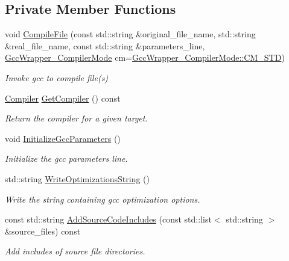\subsection*{Private Member Functions}
\begin{DoxyCompactItemize}
\item 
void \hyperlink{classGccWrapper_a8cd41a8c53b37b900efb3363a9612bdc}{Compile\+File} (const std\+::string \&original\+\_\+file\+\_\+name, std\+::string \&real\+\_\+file\+\_\+name, const std\+::string \&parameters\+\_\+line, \hyperlink{gcc__wrapper_8hpp_a6625f9f7120deee0b77a8179ae2a7fe9}{Gcc\+Wrapper\+\_\+\+Compiler\+Mode} cm=\hyperlink{gcc__wrapper_8hpp_a6625f9f7120deee0b77a8179ae2a7fe9a1cce81afdcb3d459d409b402ef97749f}{Gcc\+Wrapper\+\_\+\+Compiler\+Mode\+::\+C\+M\+\_\+\+S\+TD})
\begin{DoxyCompactList}\small\item\em Invoke gcc to compile file(s) \end{DoxyCompactList}\item 
\hyperlink{classGccWrapper_1_1Compiler}{Compiler} \hyperlink{classGccWrapper_a2de0745c83e81e349b84a99b68b2519e}{Get\+Compiler} () const
\begin{DoxyCompactList}\small\item\em Return the compiler for a given target. \end{DoxyCompactList}\item 
void \hyperlink{classGccWrapper_a4a76e5df0a374c835ce31580a2da8c7a}{Initialize\+Gcc\+Parameters} ()
\begin{DoxyCompactList}\small\item\em Initialize the gcc parameters line. \end{DoxyCompactList}\item 
std\+::string \hyperlink{classGccWrapper_ab15234a29c83e2ed44b89297ebbcd0d1}{Write\+Optimizations\+String} ()
\begin{DoxyCompactList}\small\item\em Write the string containing gcc optimization options. \end{DoxyCompactList}\item 
const std\+::string \hyperlink{classGccWrapper_a7adb23681d3cc41de3bd7063ec636de7}{Add\+Source\+Code\+Includes} (const std\+::list$<$ std\+::string $>$ \&source\+\_\+files) const
\begin{DoxyCompactList}\small\item\em Add includes of source file directories. \end{DoxyCompactList}\item 

\end{DoxyCompactItemize}
